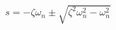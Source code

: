 \documentclass[preview]{standalone}
\begin{document}
\begin{align*}
s = -\zeta\omega_n \pm \sqrt{\zeta^2\omega_n^2 - \omega_n^2}
\end{align*}
\end{document}
